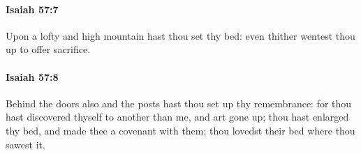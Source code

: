 		\paragraph{Isaiah 57:7} %
			\label{ISAIAH-57-7}

			Upon a lofty and high mountain hast thou set thy bed: even thither wentest thou up to offer sacrifice.


		\paragraph{Isaiah 57:8} %
			\label{ISAIAH-57-8}

			Behind the doors also and the posts hast thou set up thy remembrance: for thou hast discovered thyself to another than me, and art gone up; thou hast enlarged thy bed, and made thee a covenant with them; thou lovedst their bed where thou sawest it.


